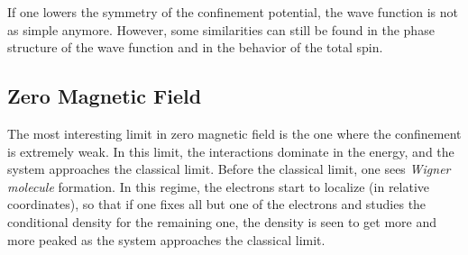 \documentclass{article}
\begin{document}
If one lowers the symmetry of the confinement potential, the wave function is
not as simple anymore. However, some similarities can still be found in the
phase structure of the wave function and in the behavior of the total
spin\cite{qdm}.




\subsection{Zero Magnetic Field}\label{zero}

The most interesting limit in zero magnetic field is the one where the
confinement is extremely weak. In this limit, the interactions
dominate in the energy, and the system approaches the classical
limit\cite{CL}. Before the classical limit, one sees {\sl Wigner
molecule} formation. In this regime, the electrons start to localize
(in relative coordinates), so that if one fixes all but one of the
electrons and studies the conditional density for the remaining one,
the density is seen to get more and more peaked as the system
approaches the classical limit\cite{Wigner}.
\end{document}
